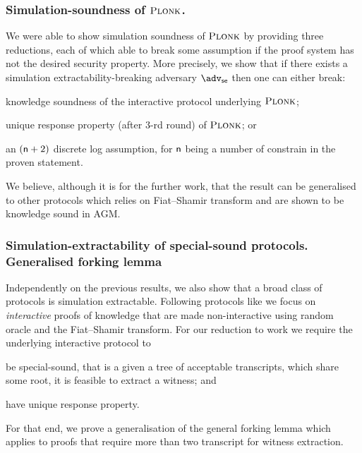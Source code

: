 \documentclass[runningheads,11pt]{llncs}
\begin{document}
	\subsubsection*{Simulation-soundness of $\textsc{Plonk}$.}
	We were able to show simulation soundness of $\textsc{Plonk}$ by providing three reductions, each of which able to break some assumption if the proof system has not the desired security property. 
	More precisely, we show that if there exists a simulation extractability-breaking adversary $\advse$ then one can either break: 
	\begin{compactenum}
		\item \label{it:ks} knowledge soundness of the interactive protocol underlying $\textsc{Plonk}$; 
		\item \label{it:dlog} unique response property (after $3$-rd round) of $\textsc{Plonk}$; or 
		\item \label{it:ur} an $(\mathsf{n} + 2)$ discrete log assumption, for $\mathsf{n}$ being a number of constrain in the proven statement.
	\end{compactenum}
	
	We believe, although it is for the further work, that the result can be generalised to other protocols which relies on Fiat--Shamir transform and are shown to be knowledge sound in AGM.
	
	\subsubsection*{Simulation-extractability of special-sound protocols. Generalised forking lemma}
	Independently on the previous results, we also show that a broad class of protocols is simulation extractable. 
	Following protocols like \cite{EPRINT:GabWilCio19,CCS:MBKM19,EC:CHMMVW20} we focus on \emph{interactive} proofs of knowledge that are made non-interactive using random oracle and the Fiat--Shamir transform. For our reduction to work we require the underlying interactive protocol to 
	\begin{compactenum}
		\item be special-sound, that is a given a tree of acceptable transcripts, which share some root, it is feasible to extract a witness; and
		\item have unique response property.
	\end{compactenum}
	For that end, we prove a generalisation of the general forking lemma which applies to proofs that require more than two transcript for witness extraction.
	
	
	
\end{document}
